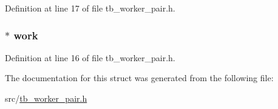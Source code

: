Definition at line 17 of file tb\-\_\-worker\-\_\-pair.\-h.

\hypertarget{structworker__tuple_a251992dcf5d5af0421eb260017a00b2a}{
\subsubsection[{work}]{$\ast$ work}}\label{structworker__tuple_a251992dcf5d5af0421eb260017a00b2a}


Definition at line 16 of file tb\-\_\-worker\-\_\-pair.\-h.



The documentation for this struct was generated from the following file\-:\begin{DoxyCompactItemize}
\item 
src/\hyperlink{tb__worker__pair_8h}{tb\-\_\-worker\-\_\-pair.\-h}\end{DoxyCompactItemize}
